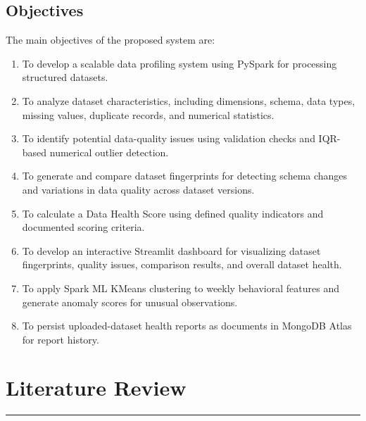 \documentclass[12pt,a4paper]{report}
\begin{document}
\section{Objectives}

The main objectives of the proposed system are:

\begin{enumerate}
    \item To develop a scalable data profiling system using PySpark for processing structured datasets.
    \item To analyze dataset characteristics, including dimensions, schema, data types, missing values, duplicate records, and numerical statistics.
    \item To identify potential data-quality issues using validation checks and IQR-based numerical outlier detection.
    \item To generate and compare dataset fingerprints for detecting schema changes and variations in data quality across dataset versions.
    \item To calculate a Data Health Score using defined quality indicators and documented scoring criteria.
    \item To develop an interactive Streamlit dashboard for visualizing dataset fingerprints, quality issues, comparison results, and overall dataset health.
    \item To apply Spark ML KMeans clustering to weekly behavioral features and generate anomaly scores for unusual observations.
    \item To persist uploaded-dataset health reports as documents in MongoDB Atlas for report history.
\end{enumerate}



\chapter{Literature Review}
\rule{\textwidth}{2pt}
\end{document}
